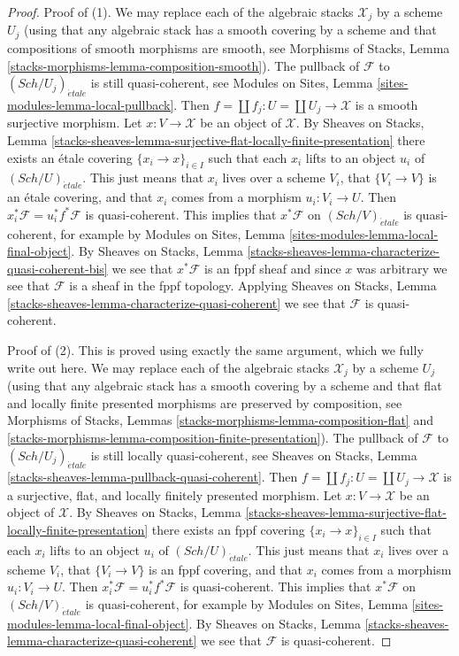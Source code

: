 \documentclass{stacks-project}
\theoremstyle{plain}
\theoremstyle{definition}
\theoremstyle{remark}
\numberwithin{equation}{subsection}
\def\Sch{\mathit{Sch}}
\def\etale{{\acute{e}tale}}
\begin{document}
\begin{proof}
Proof of (1). We may replace each of the algebraic stacks $\mathcal{X}_j$
by a scheme $U_j$ (using that any algebraic stack has a smooth covering by
a scheme and that compositions of smooth morphisms are smooth, see
Morphisms of Stacks, Lemma \ref{stacks-morphisms-lemma-composition-smooth}).
The pullback of $\mathcal{F}$ to $(\Sch/U_j)_\etale$ is still
quasi-coherent, see
Modules on Sites, Lemma \ref{sites-modules-lemma-local-pullback}.
Then $f = \coprod f_j : U = \coprod U_j \to \mathcal{X}$ is a smooth surjective
morphism. Let $x : V \to \mathcal{X}$ be an object of $\mathcal{X}$. By
Sheaves on Stacks, Lemma
\ref{stacks-sheaves-lemma-surjective-flat-locally-finite-presentation}
there exists an \'etale covering $\{x_i \to x\}_{i \in I}$
such that each $x_i$ lifts to an object $u_i$ of $(\Sch/U)_\etale$.
This just means that $x_i$ lives over a scheme $V_i$, that
$\{V_i \to V\}$ is an \'etale covering, and that $x_i$ comes from
a morphism $u_i : V_i \to U$. Then
$x_i^*\mathcal{F} = u_i^*f^*\mathcal{F}$ is quasi-coherent.
This implies that $x^*\mathcal{F}$ on $(\Sch/V)_\etale$
is quasi-coherent, for example by
Modules on Sites, Lemma \ref{sites-modules-lemma-local-final-object}.
By Sheaves on Stacks, Lemma
\ref{stacks-sheaves-lemma-characterize-quasi-coherent-bis}
we see that $x^*\mathcal{F}$ is an fppf sheaf and since $x$
was arbitrary we see that $\mathcal{F}$ is a sheaf in the
fppf topology. Applying Sheaves on Stacks, Lemma
\ref{stacks-sheaves-lemma-characterize-quasi-coherent}
we see that $\mathcal{F}$ is quasi-coherent.

\medskip\noindent
Proof of (2). This is proved using exactly the same argument, which we fully
write out here. We may replace each of the algebraic stacks $\mathcal{X}_j$
by a scheme $U_j$ (using that any algebraic stack has a smooth covering by
a scheme and that flat and locally finite presented morphisms are preserved
by composition, see Morphisms of Stacks, Lemmas
\ref{stacks-morphisms-lemma-composition-flat} and
\ref{stacks-morphisms-lemma-composition-finite-presentation}).
The pullback of $\mathcal{F}$ to $(\Sch/U_j)_\etale$ is still
locally quasi-coherent, see
Sheaves on Stacks, Lemma \ref{stacks-sheaves-lemma-pullback-quasi-coherent}.
Then $f = \coprod f_j : U = \coprod U_j \to \mathcal{X}$ is a surjective,
flat, and locally finitely presented morphism. Let
$x : V \to \mathcal{X}$ be an object of $\mathcal{X}$. By
Sheaves on Stacks, Lemma
\ref{stacks-sheaves-lemma-surjective-flat-locally-finite-presentation}
there exists an fppf covering $\{x_i \to x\}_{i \in I}$
such that each $x_i$ lifts to an object $u_i$ of $(\Sch/U)_\etale$.
This just means that $x_i$ lives over a scheme $V_i$, that
$\{V_i \to V\}$ is an fppf covering, and that $x_i$ comes from
a morphism $u_i : V_i \to U$. Then
$x_i^*\mathcal{F} = u_i^*f^*\mathcal{F}$ is quasi-coherent.
This implies that $x^*\mathcal{F}$ on $(\Sch/V)_\etale$
is quasi-coherent, for example by
Modules on Sites, Lemma \ref{sites-modules-lemma-local-final-object}.
By Sheaves on Stacks, Lemma
\ref{stacks-sheaves-lemma-characterize-quasi-coherent}
we see that $\mathcal{F}$ is quasi-coherent.
\end{proof}
\end{document}
